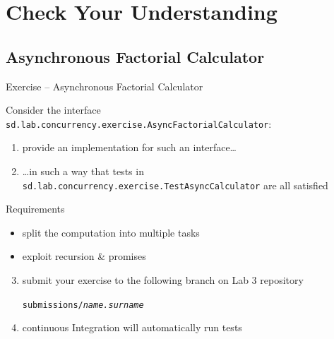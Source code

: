 \documentclass[presentation]{beamer}\mode<presentation>{\usetheme{AMSBolognaFC}}
\begin{document}
\section{Check Your Understanding}

\startExercise

\subsection{Asynchronous Factorial Calculator}

\begin{frame}[c,allowframebreaks]{Exercise \currentExercise{} -- Asynchronous Factorial Calculator}

	Consider the interface \texttt{sd.lab.concurrency.exercise.\alert{AsyncFactorialCalculator}}:
	\bigskip
	
	\bigskip
	\begin{enumerate}
		\item provide an implementation for such an interface\ldots

		\bigskip

		\item \ldots in such a way that tests in \texttt{sd.lab\allowbreak{}.concurrency\allowbreak{}.exercise\allowbreak{}.\alert{TestAsyncCalculator}} are all satisfied

	\end{enumerate}

    \framebreak

	\begin{block}{Requirements}
		\begin{itemize}
			\item split the computation into multiple tasks
			\item exploit recursion \& promises
		\end{itemize}
	\end{block}

	\bigskip

    \begin{enumerate}\setcounter{enumi}{2}

		\item submit your exercise to the following branch on Lab 3 repository
		\begin{center}
			\texttt{submissions/\textit{name.surname}}
		\end{center}

		\bigskip

		\item continuous Integration will automatically run tests
	\end{enumerate}

\end{frame}
\end{document}
